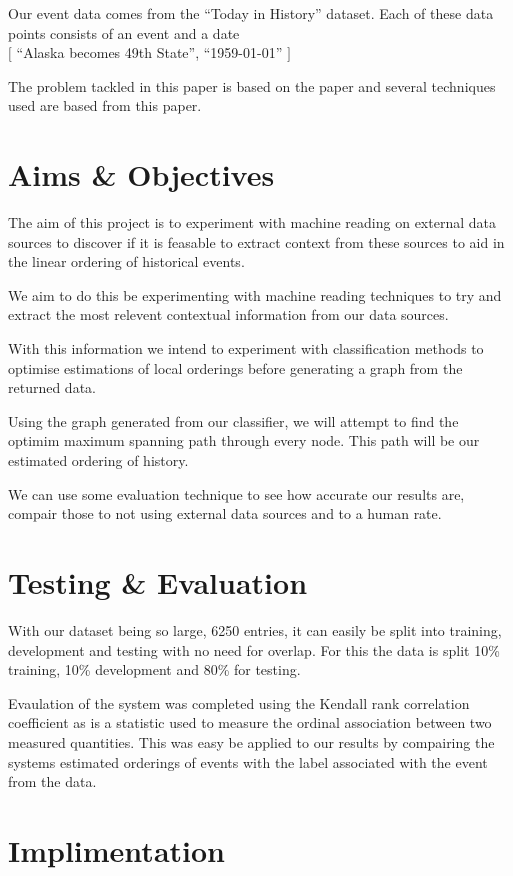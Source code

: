 \documentclass[bsc,frontabs,twoside,singlespacing,parskip,deptreport]{infthesis}     %
\begin{document}
Our event data comes from the ``Today in History'' dataset. Each of these data points consists
of an event and a date\\
$[$ ``Alaska becomes 49th State'', ``1959-01-01'' $]$


The problem tackled in this paper is based on the paper \cite{abend2015lexical} and several
techniques used are based from this paper. 

\section{Aims \& Objectives}

The aim of this project is to experiment with machine reading on external data sources to
discover if it is feasable to extract context from these sources to aid in the linear ordering
of historical events.

We aim to do this be experimenting with machine reading techniques to try and extract the most
relevent contextual information from our data sources.

With this information we intend to experiment with classification methods to optimise estimations
of local orderings before generating a graph from the returned data.

Using the graph generated from our classifier, we will attempt to find the optimim maximum spanning path
through every node. This path will be our estimated ordering of history.

We can use some evaluation technique to see how accurate our results are, compair those to not using
external data sources and to a human rate.


\section{Testing \& Evaluation}
With our dataset being so large, 6250 entries, it can
easily be split into training, development and testing with no
need for overlap. For this the data is split 10\% training,
10\% development and 80\% for testing.

Evaulation of the system was completed using the
Kendall rank correlation coefficient as is a statistic
used to measure the ordinal association between two
measured quantities. This was easy be applied to our results
by compairing the systems estimated orderings of events
with the label associated with the event from the data.

\section{Implimentation}
\end{document}
